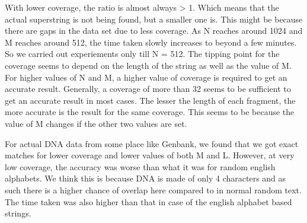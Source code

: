 \documentclass{article}
\begin{document}
With lower coverage, the ratio is almost always > 1. Which means that the actual superstring is not being found, but a smaller one is. This might be because there are gaps in the data set due to less coverage. 
As N reaches around 1024 and M reaches around 512, the time taken slowly increases to beyond a few minutes. So we carried out experiements only till N = 512.
The tipping point for the coverage seems to depend on the length of the string as well as the value of M. For higher values of N and M, a higher value of coverage is required to get an accurate result. Generally, a coverage of more than 32 seems to be sufficient to get an accurate result in most cases. 
The lesser the length of each fragment, the more accurate is the result for the same coverage. This seems to be because the value of M changes if the other two values are set. 

For actual DNA data from some place like Genbank, we found that we got exact matches for lower coverage and lower values of both M and L. However, at very low coverage, the accuracy was worse than what it was for random english alphabets. We think this is because DNA is made of only 4 characters and as such there is a higher chance of overlap here compared to in normal random text. The time taken was also higher than that in case of the english alphabet based strings.
\end{document}
